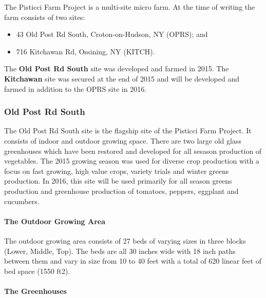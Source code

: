 
The Pisticci Farm Project is a multi-site micro farm. At the time of
writing the farm consists of two sites:

\begin{itemize}
\itemsep1pt\parskip0pt
\item
  43 Old Post Rd South, Croton-on-Hudson, NY (OPRS); and
\item
  716 Kitchawan Rd, Ossining, NY (KITCH).
\end{itemize}

The \textbf{Old Post Rd South} site was developed and farmed in 2015.
The \textbf{Kitchawan} site was secured at the end of 2015 and will be
developed and farmed in addition to the OPRS site in 2016.

\subsubsection{Old Post Rd South}\label{old-post-rd-south}

The Old Post Rd South site is the flagship site of the Pisticci Farm
Project. It consists of indoor and outdoor growing space. There are two
large old glass greenhouses which have been restored and developed for
all sesason production of vegetables. The 2015 growing season was used
for diverse crop production with a focus on fast growing, high value
crops, variety trials and winter greens production. In 2016, this site
will be used primarily for all season greens production and greenhouse
production of tomatoes, peppers, eggplant and cucumbers.

\paragraph{The Outdoor Growing Area}\label{the-outdoor-growing-area}

The outdoor growing area consists of 27 beds of varying sizes in three
blocks (Lower, Middle, Top). The beds are all 30 inches wide with 18
inch paths between them and vary in size from 10 to 40 feet with a total
of 620 linear feet of bed space (1550 ft2).

\paragraph{The Greenhouses}\label{the-greenhouses}

